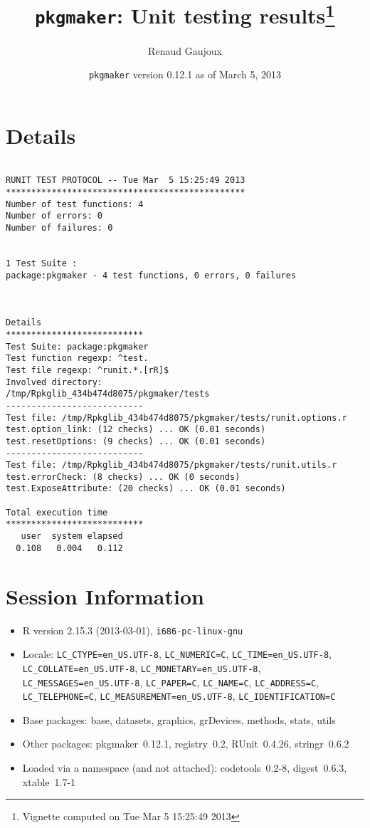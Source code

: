 \documentclass[10pt]{article}
\author{Renaud Gaujoux}
\title{\texttt{pkgmaker}: Unit testing results\footnote{Vignette computed  on Tue Mar  5 15:25:49 2013}}
\date{\texttt{pkgmaker} version 0.12.1 as of March  5, 2013}
\begin{document}
\maketitle

\section{Details}
\begin{verbatim}

RUNIT TEST PROTOCOL -- Tue Mar  5 15:25:49 2013 
*********************************************** 
Number of test functions: 4 
Number of errors: 0 
Number of failures: 0 

 
1 Test Suite : 
package:pkgmaker - 4 test functions, 0 errors, 0 failures



Details 
*************************** 
Test Suite: package:pkgmaker 
Test function regexp: ^test. 
Test file regexp: ^runit.*.[rR]$ 
Involved directory: 
/tmp/Rpkglib_434b474d8075/pkgmaker/tests 
--------------------------- 
Test file: /tmp/Rpkglib_434b474d8075/pkgmaker/tests/runit.options.r 
test.option_link: (12 checks) ... OK (0.01 seconds)
test.resetOptions: (9 checks) ... OK (0.01 seconds)
--------------------------- 
Test file: /tmp/Rpkglib_434b474d8075/pkgmaker/tests/runit.utils.r 
test.errorCheck: (8 checks) ... OK (0 seconds)
test.ExposeAttribute: (20 checks) ... OK (0.01 seconds)

Total execution time
***************************
   user  system elapsed 
  0.108   0.004   0.112 

\end{verbatim}

\section*{Session Information}
\begin{itemize}\raggedright
  \item R version 2.15.3 (2013-03-01), \verb|i686-pc-linux-gnu|
  \item Locale: \verb|LC_CTYPE=en_US.UTF-8|, \verb|LC_NUMERIC=C|, \verb|LC_TIME=en_US.UTF-8|, \verb|LC_COLLATE=en_US.UTF-8|, \verb|LC_MONETARY=en_US.UTF-8|, \verb|LC_MESSAGES=en_US.UTF-8|, \verb|LC_PAPER=C|, \verb|LC_NAME=C|, \verb|LC_ADDRESS=C|, \verb|LC_TELEPHONE=C|, \verb|LC_MEASUREMENT=en_US.UTF-8|, \verb|LC_IDENTIFICATION=C|
  \item Base packages: base, datasets, graphics, grDevices, methods,
    stats, utils
  \item Other packages: pkgmaker~0.12.1, registry~0.2, RUnit~0.4.26,
    stringr~0.6.2
  \item Loaded via a namespace (and not attached): codetools~0.2-8,
    digest~0.6.3, xtable~1.7-1
\end{itemize}
\end{document}
